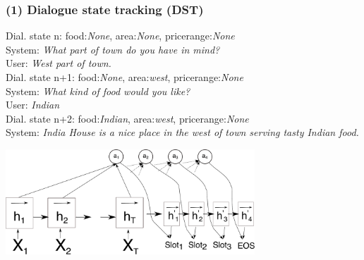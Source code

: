 \documentclass[10pt, compress,british,xcolor={svgnames,dvipsnames,x11names},trans]{beamer}
\def\area#1{{\color{darkgreen}area:\it #1}}
\def\food#1#2{{Dial. state #1: \color{blue}food:\it #2}}
\def\pricerange#1{{\color{orange}pricerange:\it #1}}
\def\sys#1{{\color{purple}System: \it #1}}
\def\usr#1{{\color{brown}User: \it #1}}
\begin{document}
\begin{frame}\frametitle{(1) Dialogue state tracking (DST)}
    \food{n}{None}, \area{None}, \pricerange{None} \\
    \sys{What part of town do you have in mind?} \\
    \usr{West part of town.} \\
    \food{n+1}{None}, \area{west}, \pricerange{None} \\
    \sys{What kind of food would you like?} \\
    \usr{Indian} \\
    \food{n+2}{Indian}, \area{west}, \pricerange{None} \\
    \sys{India House is a nice place in the west of town serving tasty Indian food.} \\
    \begin{center}
        \includegraphics[width=0.7\textwidth]{encdec}
    \end{center}
\end{frame}
\end{document}
